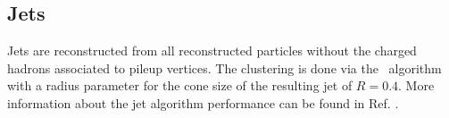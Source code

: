 \subsection{Jets}
\label{sec:JetID}
Jets are reconstructed  from all reconstructed particles without the charged hadrons associated to pileup vertices. The clustering is done via the \antikt\ algorithm~\cite{Cacciari:2008gp} with a radius parameter for the cone size of the resulting jet of $R=0.4$. %
More information about the jet algorithm performance can be found in Ref. \cite{CMS-PAS-JME-16-003}.

